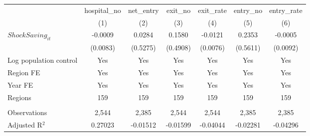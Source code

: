 \begingroup
\centering
\begin{tabular}{lcccccc}
   \toprule
                          & hospital\_no  & net\_entry  & exit\_no  & exit\_rate  & entry\_no  & entry\_rate \\    
                          & (1)           & (2)         & (3)       & (4)         & (5)        & (6)\\  
   \midrule 
   $ShockSaving_{it}$     & -0.0009       & 0.0284      & 0.1580    & -0.0121     & 0.2353     & -0.0005\\   
                          & (0.0083)      & (0.5275)    & (0.4908)  & (0.0076)    & (0.5611)   & (0.0092)\\   
   Log population control & Yes           & Yes         & Yes       & Yes         & Yes        & Yes\\  
   Region FE              & Yes           & Yes         & Yes       & Yes         & Yes        & Yes\\  
   Year FE                & Yes           & Yes         & Yes       & Yes         & Yes        & Yes\\  
   Regions                & 159           & 159         & 159       & 159         & 159        & 159\\  
    \\
   Observations           & 2,544         & 2,385       & 2,544     & 2,544       & 2,385      & 2,385\\  
   Adjusted R$^2$         & 0.27023       & -0.01512    & -0.01599  & -0.04044    & -0.02281   & -0.04296\\  
   \bottomrule
\end{tabular}
\par\endgroup
